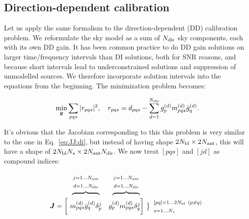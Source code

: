 \documentclass[useAMS,usenatbib]{mn2e}
\newcommand{\mat}[1]{{\bmath{#1}}}
\newcommand{\JJ}{\mat{J}} %
\newcommand{\MM}{\mat{M}}
\newcommand{\GG}{\mat{G}}
\begin{document}
\subsection{Direction-dependent calibration}
\label{sec:unpol:DD}

Let us apply the same formalism to the direction-dependent (DD) calibration problem. 
We reformulate the sky model as a sum of $N_\mathrm{dir}$ sky components, each with its own DD 
gain. It has been common practice to do DD gain solutions on larger time/frequency intervals than DI 
solutions, both for SNR reasons, and because short intervals lead to underconstrained solutions
and suppression of unmodelled sources. We therefore incorporate solution intervals into the
equations from the beginning. The minimization problem becomes:

\newcommand{\GGd}{\GG^{(d)}}
\newcommand{\GGdH}{\GG^{(d)H}}
\newcommand{\MMd}{\MM^{(d)}}
\newcommand{\YYd}{\YY^{(d)}}
\newcommand{\YYdH}{\YY^{(d)H}}
\newcommand{\YYc}{\YY^{(c)}}
\newcommand{\YYcH}{\YY^{(c)H}}
\newcommand{\ggd}{g^{(d)}}
\newcommand{\ggdH}{\bar{g}^{(d)}}
\newcommand{\ggc}{g^{(c)}}
\newcommand{\ggcH}{\bar{g}^{(c)}}
\newcommand{\mmc}{m^{(c)}}
\newcommand{\mmd}{m^{(d)}}
\newcommand{\mmcH}{\bar{m}^{(c)}}
\newcommand{\mmdH}{\bar{m}^{(d)}}
\newcommand{\yyd}{y^{(d)}}
\newcommand{\yydH}{\bar{y}^{(d)}}
\newcommand{\yyc}{y^{(c)}}
\newcommand{\yycH}{\bar{y}^{(c)}}

\begin{equation}
\label{eq:cal:dd:unpol}
\min_{\bmath{g}}\sum_{pqs}|r_{pqs}|^2, ~~~
r_{pqs} = d_{pqs} - \sum_{d=1}^{\Nd} \ggd_p \mmd_{pqs} \ggdH_q.
\end{equation}

It's obvious that the Jacobian corresponding to this  this problem is very similar to the one 
in Eq.~\ref{eq:JJ:di}, but instead of having shape $2N_\mathrm{bl}\times2N_\mathrm{ant}$, this will have a 
shape of $2N_\mathrm{bl}N_s\times 2N_\mathrm{ant}N_\mathrm{dir}$. We now treat $[pqs]$ and $[jd]$ as compound indices: 

\[
\begin{array}{r@{~}cc@{~}cc}
 & \overbrace{~~~~~~~~~~~~}^{\Stack{\scriptstyle j=1\dots \Na\\\scriptstyle d=1\dots \Nd}} & 
   \overbrace{~~~~~~~~~~~~}^{\Stack{\scriptstyle j=1\dots \Na\\\scriptstyle d=1\dots \Nd}} \\
\JJ = \bigg [ &
  \mmd_{pqs}\ggdH_q \delta^j_p & 
  \ggd_p \mmd_{pqs}  \delta^j_q 
\bigg ] &
\big \}
\begin{array}{l}
\scriptstyle [pq]=1\dots 2\Nbl~(p\ne q)\\ \scriptstyle s=1\dots\Ns
\end{array}

\end{array}
\]
\end{document}
